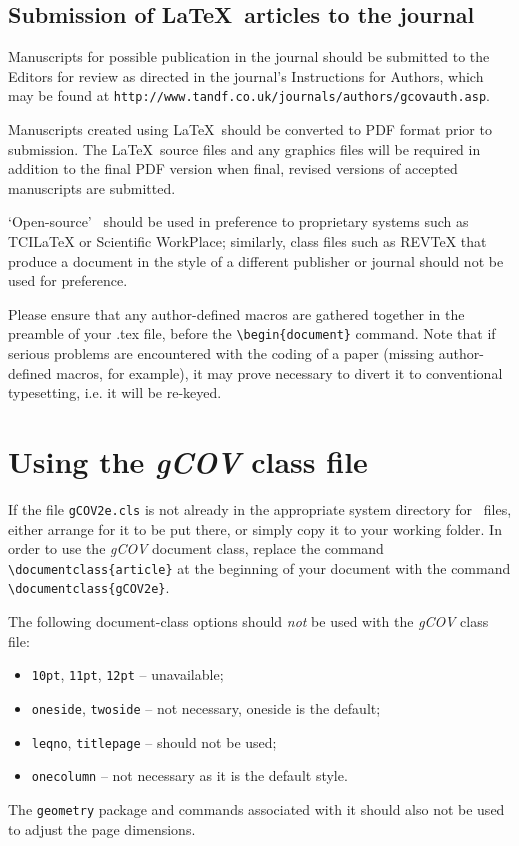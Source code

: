 \documentclass{gCOV2e}
\theoremstyle{plain}%
\theoremstyle{definition}
\theoremstyle{remark}
\begin{document}
\subsection{Submission of \LaTeX\ articles to the journal}\label{submission}

Manuscripts for possible publication in the journal should be submitted to the Editors for review as directed in the journal's Instructions for Authors, which may be found at \texttt{http://www.tandf.co.uk/journals/authors/gcovauth.asp}.

Manuscripts created using \LaTeX\ should be converted to PDF format prior to submission. The \LaTeX\ source files and any graphics files will be required in addition to the final PDF version when final, revised versions of accepted manuscripts are submitted.

`Open-source' \LaTeXe\ should be used in preference to proprietary systems such as TCILaTeX or Scientific WorkPlace; similarly, class files such as REVTeX that produce a document in the style of a different publisher or journal should not be used for preference.

Please ensure that any author-defined macros are gathered together in the preamble of your .tex file, before the
\verb"\begin{document}" command. Note that if serious problems are encountered with the coding of a paper (missing author-defined macros,
for example), it may prove necessary to divert it to conventional typesetting, i.e. it will be re-keyed.


\section{Using the \textit{gCOV} class file}

If the file \texttt{gCOV2e.cls} is not already in the appropriate system directory for \LaTeXe\ files, either
arrange for it to be put there, or simply copy it to your working folder. In order to use the \textit{gCOV} document class, replace the command
\verb"\documentclass{article}" at the beginning of your document with the command \verb"\documentclass{gCOV2e}".

The following document-class options should \emph{not} be used with the \textit{gCOV} class file:
\begin{itemize}
  \item \texttt{10pt}, \texttt{11pt}, \texttt{12pt} -- unavailable;
  \item \texttt{oneside}, \texttt{twoside} -- not necessary, oneside is the default;
  \item \texttt{leqno}, \texttt{titlepage} -- should not be used;
  \item \texttt{onecolumn} -- not necessary as it is the default style.
\end{itemize}
The \texttt{geometry} package and commands associated with it should also not be used to adjust the page dimensions.
\end{document}

